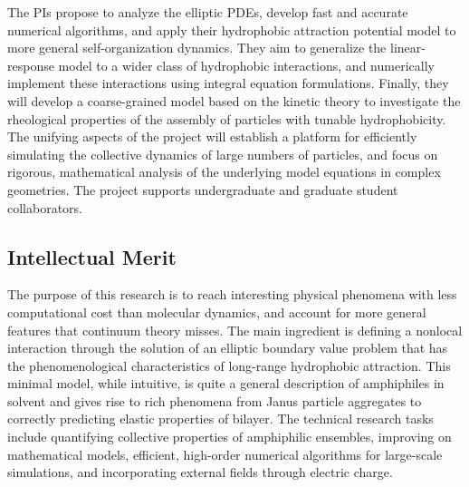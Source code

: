 \documentclass[10pt]{article}
\begin{document}
The PIs propose to analyze the elliptic PDEs, develop fast and accurate
numerical algorithms, and apply their hydrophobic attraction potential
model to more general self-organization dynamics. They aim to generalize
the linear-response model to a wider class of hydrophobic interactions,
and numerically implement these interactions using integral equation
formulations. Finally, they will develop a coarse-grained model based on
the kinetic theory to investigate the rheological properties of the
assembly of particles with tunable hydrophobicity. The unifying aspects
of the project will establish a platform for efficiently simulating
the collective dynamics of large numbers of particles, and focus on
rigorous, mathematical analysis of the underlying model equations in
complex geometries. The project supports undergraduate and graduate
student collaborators.

\subsection*{Intellectual Merit}
\vspace{-0.1in}
The purpose of this research is to reach interesting physical phenomena
with less computational cost than molecular dynamics, and account for
more general features that continuum theory misses. The main ingredient
is defining a nonlocal interaction through the solution of an elliptic
boundary value problem that has the phenomenological characteristics of
long-range hydrophobic attraction. This minimal model, while intuitive,
is quite a general description of amphiphiles in solvent and gives rise
to rich phenomena from Janus particle aggregates to correctly predicting
elastic properties of bilayer. The technical research tasks include
quantifying collective properties of amphiphilic ensembles, improving on
mathematical models, efficient, high-order numerical algorithms for
large-scale simulations, and incorporating external fields through
electric charge.
\end{document}
